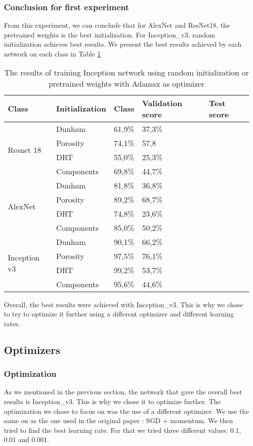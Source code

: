 \subsubsection{Conclusion for first experiment}
From this experiment, we can conclude that for AlexNet and ResNet18, the pretrained weights is the best initialization. For Inception\_v3, random initialization achieves best results. We present the best results achieved by each network on each class in Table \ref{tab:finalinit}
\begin{table}
\caption{\label{tab:finalinit} The results of training Inception network using random initialization or pretrained weights with Adamax as optimizer}
\centering
\begin{tabular}[b]{| l | l | l | l | l |}
\hline
    Class & Initialization & Class & Validation score  & Test score\\ \hline
    \multirow{4}{*}{Resnet 18} & Dunham &  61,9\%  & 37,3\% \\ 
    & Porosity & 74,1\% &  57,8\\
    &DRT & 55,0\% &  25,3\% \\
    &Components & 69,8\% &  44,7\% \\ \hline
     \multirow{4}{*}{AlexNet} & Dunham &  81,8\% & 36,8\% \\
    & Porosity & 89,2\% &  68,7\% \\
    &DRT & 74,8\% &   23,6\% \\
    &Components & 85,0\% & 50,2\% \\ \hline
    \multirow{4}{*}{Inception v3} & Dunham &  90,1\% & 66,2\% \\
    & Porosity & 97,5\% &  76,1\% \\
    &DRT & 99,2\% &  53,7\% \\
    &Components & 95,6\% & 44,6\% \\ \hline
\end{tabular} 
\end{table}

Overall, the best results were achieved with Inception\_v3. This is why we chose to try to optimize it further using a different optimizer and different learning rates. 


\subsection{Optimizers}
\subsubsection{Optimization}
As we mentioned in the previous section, the network that gave the overall best results is Inception\_v3.
This is why we chose it to optimize further. The optimization we chose to focus on was the use of a different optimizer. We use the same on as the one used in the original paper \cite{googlepaper}: SGD + momentum. We then tried to find the best learning rate. For that we tried three different values: 0.1, 0.01 and 0.001.

